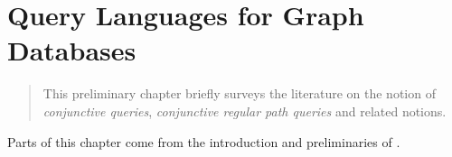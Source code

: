 \chapter{Query Languages for Graph Databases}
\label{ch:prelim-graph-databases}

\begin{chapterpresentation}
	\begin{abstract}
		This preliminary chapter briefly surveys the literature on
		the notion of \emph{conjunctive queries},
		\emph{conjunctive regular path queries} and related notions.

	\end{abstract}
	\par\bigskip\bigskip
	\begin{acknowledgements}
		Parts of this chapter come from the introduction and preliminaries of \cite{FigueiraMorvan2025SemanticTreeWidthLMCS,FigueiraMorvanRomero2025Minimizing}.
	\end{acknowledgements}
	\clearpagepresentation
	\chaptertocstandalone
\end{chapterpresentation}


